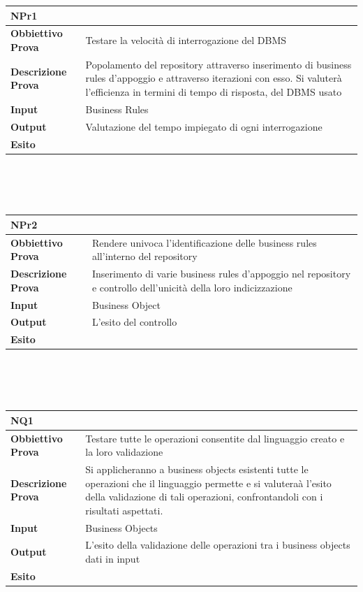 \documentclass[11pt,titlepage,a4paper]{report}
\begin{document}
\begin{tabular}{||p{4.5cm}||p{7.5cm}||}
\hline
\textbf{\textsf{NPr1}}& \\
\hline
{\textbf{Obbiettivo Prova}}& Testare la velocit\`a di interrogazione del DBMS\\ \hline
{\textbf{Descrizione Prova}}& Popolamento del repository attraverso inserimento di business rules d'appoggio e attraverso iterazioni con esso. Si valuter\`a l'efficienza in termini di tempo di risposta, del DBMS usato  \\ \hline
{\textbf{Input}}& Business Rules \\ \hline
{\textbf{Output}}& Valutazione del tempo impiegato di ogni interrogazione \\ \hline
{\textbf{Esito}}&  \\ \hline
\end{tabular} \\
\\
\\
\begin{tabular}{||p{4.5cm}||p{7.5cm}||}
\hline
\textbf{\textsf{NPr2}}& \\
\hline
{\textbf{Obbiettivo Prova}}& Rendere univoca l'identificazione delle business rules all'interno del repository \\ \hline
{\textbf{Descrizione Prova}}& Inserimento di varie business rules d'appoggio nel repository e controllo dell'unicit\`a della loro indicizzazione \\ \hline
{\textbf{Input}}& Business Object \\ \hline
{\textbf{Output}}& L'esito del controllo\\ \hline
{\textbf{Esito}}&  \\ \hline
\end{tabular} \\
\\
\\
\begin{tabular}{||p{4.5cm}||p{7.5cm}||}
\hline
\textbf{\textsf{NQ1}}& \\
\hline
{\textbf{Obbiettivo Prova}}& Testare tutte le operazioni consentite dal linguaggio creato e la loro validazione\\ \hline
{\textbf{Descrizione Prova}}& Si applicheranno a business objects esistenti tutte le operazioni che il linguaggio permette e si valutera\`a l'esito della validazione di tali operazioni, confrontandoli con i risultati aspettati.  \\ \hline
{\textbf{Input}}& Business Objects \\ \hline
{\textbf{Output}}& L'esito della validazione delle operazioni tra i business objects dati in input\\ \hline
{\textbf{Esito}}&  \\ \hline
\end{tabular} \\
\end{document}
